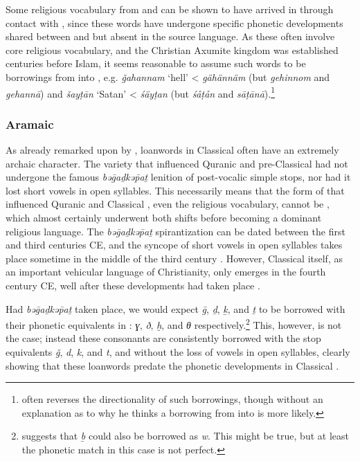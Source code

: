 \documentclass[output=paper]{langsci/langscibook}
\begin{document}
Some religious vocabulary from  and  can be shown to have arrived in  through contact with , since these words have undergone specific phonetic developments shared between  and  but absent in the {source language}. As these often involve core religious vocabulary, and the Christian Axumite kingdom was established centuries before Islam, it seems reasonable to assume such words to be borrowings from  into , e.g.  \textit{ǧahannam} ‘hell’ <  \textit{gähännäm} (but  \textit{gehinnom} and  \textit{gehannā}) and  \textit{šayṭān} ‘Satan’ <  \textit{śäyṭan} (but  \textit{śåṭån} and  \textit{sāṭānā}).\footnote{\citet{Leslau1990} often reverses the directionality of such borrowings, though without an explanation as to why he thinks a borrowing from  into  is more likely.}

\subsubsection{\label{bkm:Ref13224460}Aramaic}

As already remarked upon by \citet{Retsö2011},  {loanwords} in Classical  often have an extremely archaic character. The  variety that influenced Quranic and pre-Classical  had not undergone the famous \textit{bəḡaḏkəp̄aṯ} lenition of post-vocalic simple stops, nor had it lost short vowels in open syllables. This necessarily means that the form of  that influenced Quranic and Classical , even the religious vocabulary, cannot be , which almost certainly underwent both shifts before becoming a dominant religious language. The \textit{bəḡaḏkəp̄aṯ} spirantization can be dated between the first and third centuries CE, and the syncope of short vowels in open syllables takes place sometime in the middle of the third century \citep[41--42]{Gzella2015}. However, Classical  itself, as an important vehicular language of Christianity, only emerges in the fourth century CE, well after these developments had taken place \citep[259]{Gzella2015}.

Had \textit{bəḡaḏkəp̄aṯ} taken place, we would expect  \textit{ḡ}, \textit{ḏ}, \textit{ḵ}, and \textit{ṯ} to be borrowed with their phonetic equivalents in : \textit{ɣ}, \textit{ð}, \textit{ḫ}, and \textit{θ} respectively.\footnote{\cite{Retsö2011} suggests that \textit{ḇ} could also be borrowed as \textit{w}. This might be true, but at least the phonetic match in this case is not perfect.} This, however, is not the case; instead these consonants are consistently borrowed with the stop equivalents \textit{ǧ}, \textit{d}, \textit{k}, and \textit{t}, and without the loss of vowels in open syllables, clearly showing that these  {loanwords} predate the phonetic developments in Classical .
\end{document}

